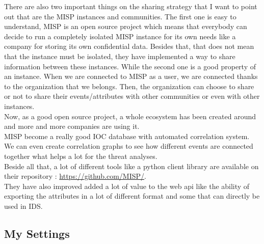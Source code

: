 \documentclass{eplmastersthesis}
\begin{document}
There are also two important things on the sharing strategy that I want to point out that are the MISP instances and communities. The first one is easy to understand, MISP is an open source project which means that everybody can decide to run a completely isolated MISP instance for its own needs like a company for storing its own confidential data. Besides that, that does not mean that the instance must be isolated, they have implemented a way to share information between these instances. While the second one is a good property of an instance. When we are connected to MISP as a user, we are connected thanks to the organization that we belongs. Then, the organization can choose to share or not to share their events/attributes with other communities or even with other instances. \\ 

Now, as a good open source project, a whole ecosystem has been created around and more and more companies are using it.\\
MISP become a really good IOC database with automated correlation system. We can even create correlation graphs to see how different events are connected together what helps a lot for the threat analyses.\\
Beside all that, a lot of different tools like a python client library are available on their repository : \url{https://github.com/MISP/}.\\
They have also improved added a lot of value to the web api like the ability of exporting the attributes in a lot of different format and some that can directly be used in IDS.\\

\subsection{My Settings}
\end{document}

